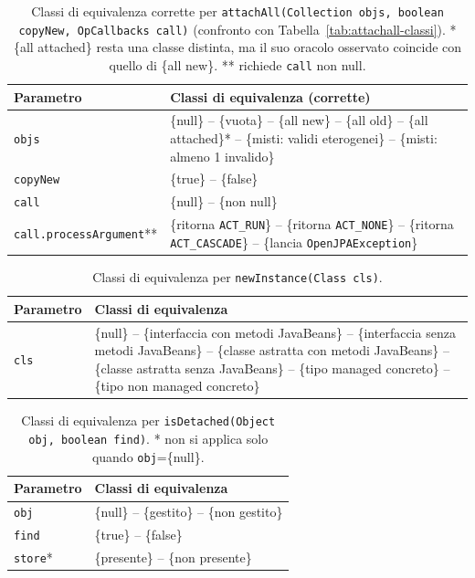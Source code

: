 \begin{table}[H]
\centering
\begin{tabularx}{\textwidth}{>{\raggedright\arraybackslash}p{} >{\raggedright\arraybackslash}X}
\toprule
Parametro & Classi di equivalenza (corrette) \\
\midrule
\texttt{objs} & \{null\} -- \{vuota\} -- \{all new\} -- \{all old\} -- \{all attached\}* --
\{misti: validi eterogenei\} -- \{misti: almeno 1 invalido\} \\
\texttt{copyNew} & \{true\} -- \{false\} \\
\midrule
\texttt{call} & \{null\} -- \{non null\} \\
\texttt{call.processArgument}** & \{ritorna \texttt{ACT\_RUN}\} -- \{ritorna \texttt{ACT\_NONE}\} --
\{ritorna \texttt{ACT\_CASCADE}\} -- \{lancia \texttt{OpenJPAException}\} \\
\bottomrule
\end{tabularx}
\caption{Classi di equivalenza corrette per \texttt{attachAll(Collection objs, boolean copyNew,
OpCallbacks call)} (confronto con Tabella~\ref{tab:attachall-classi}). * \{all attached\} resta
una classe distinta, ma il suo oracolo osservato coincide con quello di \{all new\}. ** richiede
\texttt{call} non null.}
\label{tab:attachall-classi-corrette}
\end{table}

\begin{table}[H]
\centering
\begin{tabularx}{\textwidth}{>{\raggedright\arraybackslash}p{} >{\raggedright\arraybackslash}X}
\toprule
Parametro & Classi di equivalenza \\
\midrule
\texttt{cls} & \{null\} -- \{interfaccia con metodi JavaBeans\} -- \{interfaccia senza metodi
JavaBeans\} -- \{classe astratta con metodi JavaBeans\} -- \{classe astratta senza JavaBeans\}
-- \{tipo managed concreto\} -- \{tipo non managed concreto\} \\
\bottomrule
\end{tabularx}
\caption{Classi di equivalenza per \texttt{newInstance(Class cls)}.}
\label{tab:newinstance-classi}
\end{table}

\begin{table}[H]
\centering
\begin{tabularx}{\textwidth}{>{\raggedright\arraybackslash}p{} >{\raggedright\arraybackslash}X}
\toprule
Parametro & Classi di equivalenza \\
\midrule
\texttt{obj} & \{null\} -- \{gestito\} -- \{non gestito\} \\
\texttt{find} & \{true\} -- \{false\} \\
\texttt{store}* & \{presente\} -- \{non presente\} \\
\bottomrule
\end{tabularx}
\caption{Classi di equivalenza per \texttt{isDetached(Object obj, boolean find)}. * non si
applica solo quando \texttt{obj}=\{null\}.}
\label{tab:isdetached-classi}
\end{table}


